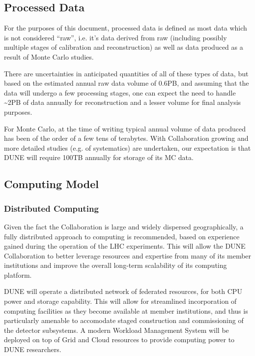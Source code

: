 \subsection{Processed Data}
\label{sec:detectors-sc-infrastructure-processed-data}
For the purposes of this document, processed data is defined as most data which is not considered ``raw'', i.e. it's data derived from raw (including possibly multiple stages
of calibration and reconstruction) as well as data produced as a result of Monte Carlo studies.

There are uncertainties in anticipated quantities of all of these types of data, but based on the estimated annual raw data volume of 0.6PB, and assuming that
the data will undergo a few processing stages, one can expect the need to handle \textasciitilde 2PB of data annually for reconstruction and a lesser
volume for final analysis purposes.

For Monte Carlo, at the time of writing typical annual volume of data produced has been of the order of a few tens of terabytes. With Collaboration growing
and more detailed studies (e.g. of systematics) are undertaken, our expectation is that DUNE will require 100TB annually for storage of its MC data.

\subsection{Computing Model}
\label{sec:detectors-sc-infrastructure-computing-model}

\subsubsection{Distributed Computing}

Given the fact the Collaboration is large and widely dispersed geographically, a fully distributed approach to computing is recommended, based on experience
gained during the operation of the LHC experiments. This will allow the DUNE Collaboration to better leverage resources and expertise from many of its
member institutions and improve the overall long-term scalability of its computing platform.

DUNE will operate a  distributed network of federated resources, for both CPU power and storage capability. This will allow for streamlined incorporation
of computing facilities as they become available at member institutions, and thus is particularly amenable to accomodate staged construction and commissioning
of the detector subsystems. A modern Workload Management System will be deployed on top of Grid and Cloud resources to provide computing
power to DUNE researchers.

